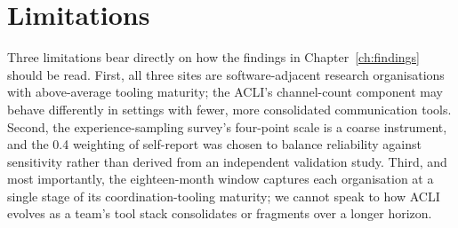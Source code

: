 \section{Limitations}

Three limitations bear directly on how the findings in
Chapter~\ref{ch:findings} should be read. First, all three sites are
software-adjacent research organisations with above-average tooling
maturity; the ACLI's channel-count component may behave differently in
settings with fewer, more consolidated communication tools. Second, the
experience-sampling survey's four-point scale is a coarse instrument, and
the 0.4 weighting of self-report was chosen to balance reliability against
sensitivity rather than derived from an independent validation study.
Third, and most importantly, the eighteen-month window captures each
organisation at a single stage of its coordination-tooling maturity; we
cannot speak to how ACLI evolves as a team's tool stack consolidates or
fragments over a longer horizon.
